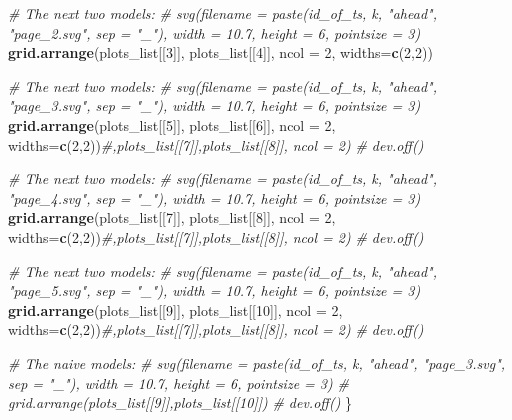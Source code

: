 \documentclass[
]{article}
\newenvironment{Shaded}{\begin{snugshade}}{\end{snugshade}}
\newcommand{\AttributeTok}[1]{\textcolor[rgb]{0.13,0.29,0.53}{#1}}
\newcommand{\CommentTok}[1]{\textcolor[rgb]{0.56,0.35,0.01}{\textit{#1}}}
\newcommand{\DecValTok}[1]{\textcolor[rgb]{0.00,0.00,0.81}{#1}}
\newcommand{\FunctionTok}[1]{\textcolor[rgb]{0.13,0.29,0.53}{\textbf{#1}}}
\newcommand{\NormalTok}[1]{#1}
\begin{document}
\begin{Shaded}
\begin{Highlighting}[]
      \CommentTok{\# The next two models:}
      \CommentTok{\# svg(filename = paste(id\_of\_ts, k, "ahead", "page\_2.svg", sep = "\_"), width = 10.7, height = 6, pointsize = 3)}
      \FunctionTok{grid.arrange}\NormalTok{(plots\_list[[}\DecValTok{3}\NormalTok{]], plots\_list[[}\DecValTok{4}\NormalTok{]], }\AttributeTok{ncol =} \DecValTok{2}\NormalTok{, }\AttributeTok{widths=}\FunctionTok{c}\NormalTok{(}\DecValTok{2}\NormalTok{,}\DecValTok{2}\NormalTok{))}

      \CommentTok{\# The next two models:}
      \CommentTok{\# svg(filename = paste(id\_of\_ts, k, "ahead", "page\_3.svg", sep = "\_"), width = 10.7, height = 6, pointsize = 3)}
      \FunctionTok{grid.arrange}\NormalTok{(plots\_list[[}\DecValTok{5}\NormalTok{]], plots\_list[[}\DecValTok{6}\NormalTok{]], }\AttributeTok{ncol =} \DecValTok{2}\NormalTok{, }\AttributeTok{widths=}\FunctionTok{c}\NormalTok{(}\DecValTok{2}\NormalTok{,}\DecValTok{2}\NormalTok{))}\CommentTok{\#,plots\_list[[7]],plots\_list[[8]], ncol = 2)}
      \CommentTok{\# dev.off()}

      \CommentTok{\# The next two models:}
      \CommentTok{\# svg(filename = paste(id\_of\_ts, k, "ahead", "page\_4.svg", sep = "\_"), width = 10.7, height = 6, pointsize = 3)}
      \FunctionTok{grid.arrange}\NormalTok{(plots\_list[[}\DecValTok{7}\NormalTok{]], plots\_list[[}\DecValTok{8}\NormalTok{]], }\AttributeTok{ncol =} \DecValTok{2}\NormalTok{, }\AttributeTok{widths=}\FunctionTok{c}\NormalTok{(}\DecValTok{2}\NormalTok{,}\DecValTok{2}\NormalTok{))}\CommentTok{\#,plots\_list[[7]],plots\_list[[8]], ncol = 2)}
      \CommentTok{\# dev.off()}

      \CommentTok{\# The next two models:}
      \CommentTok{\# svg(filename = paste(id\_of\_ts, k, "ahead", "page\_5.svg", sep = "\_"), width = 10.7, height = 6, pointsize = 3)}
      \FunctionTok{grid.arrange}\NormalTok{(plots\_list[[}\DecValTok{9}\NormalTok{]], plots\_list[[}\DecValTok{10}\NormalTok{]], }\AttributeTok{ncol =} \DecValTok{2}\NormalTok{, }\AttributeTok{widths=}\FunctionTok{c}\NormalTok{(}\DecValTok{2}\NormalTok{,}\DecValTok{2}\NormalTok{))}\CommentTok{\#,plots\_list[[7]],plots\_list[[8]], ncol = 2)}
      \CommentTok{\# dev.off()}
      
      \CommentTok{\# The naive models:}
      \CommentTok{\# svg(filename = paste(id\_of\_ts, k, "ahead", "page\_3.svg", sep = "\_"), width = 10.7, height = 6, pointsize = 3)}
      \CommentTok{\# grid.arrange(plots\_list[[9]],plots\_list[[10]])}
      \CommentTok{\# dev.off()}
\NormalTok{    \}}
    

\end{Highlighting}
\end{Shaded}
\end{document}
